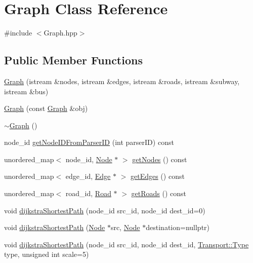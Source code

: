 \hypertarget{class_graph}{}\section{Graph Class Reference}
\label{class_graph}


{\ttfamily \#include $<$Graph.\+hpp$>$}

\subsection*{Public Member Functions}
\begin{DoxyCompactItemize}
\item 
\hyperlink{class_graph_aadb341e62a5548bf406c05834aa187da}{Graph} (istream \&nodes, istream \&edges, istream \&roads, istream \&subway, istream \&bus)
\item 
\hyperlink{class_graph_a7a3f0c7dceffa85819bf122c49fd973c}{Graph} (const \hyperlink{class_graph}{Graph} \&obj)
\item 
\hyperlink{class_graph_a902c5b3eacb66d60752525ab23297a95}{$\sim$\+Graph} ()
\item 
node\+\_\+id \hyperlink{class_graph_aec10981cceac64d033e2e0de5b34c995}{get\+Node\+I\+D\+From\+Parser\+ID} (int parser\+ID) const
\item 
unordered\+\_\+map$<$ node\+\_\+id, \hyperlink{class_node}{Node} $\ast$ $>$ \hyperlink{class_graph_aa64f6696d40b6a8e0d92df399ed11310}{get\+Nodes} () const
\item 
unordered\+\_\+map$<$ edge\+\_\+id, \hyperlink{class_edge}{Edge} $\ast$ $>$ \hyperlink{class_graph_a7dd776ad17a9d14b14f044373c79a9bc}{get\+Edges} () const
\item 
unordered\+\_\+map$<$ road\+\_\+id, \hyperlink{class_road}{Road} $\ast$ $>$ \hyperlink{class_graph_a101befc9baedb7dc3aaa714c968dc943}{get\+Roads} () const
\item 
void \hyperlink{class_graph_a819fb225997f026a192ec5df1b17df84}{dijkstra\+Shortest\+Path} (node\+\_\+id src\+\_\+id, node\+\_\+id dest\+\_\+id=0)
\item 
void \hyperlink{class_graph_a0fc41701fa170ab69282ae8a571fdc04}{dijkstra\+Shortest\+Path} (\hyperlink{class_node}{Node} $\ast$src, \hyperlink{class_node}{Node} $\ast$destination=nullptr)
\item 
void \hyperlink{class_graph_a751cdeb2ca841f9d44d921cf1a43ddd0}{dijkstra\+Shortest\+Path} (node\+\_\+id src\+\_\+id, node\+\_\+id dest\+\_\+id, \hyperlink{class_transport_a1879cecfed0d4238e5a7af6d085db317}{Transport\+::\+Type} type, unsigned int scale=5)

\end{DoxyCompactItemize}
